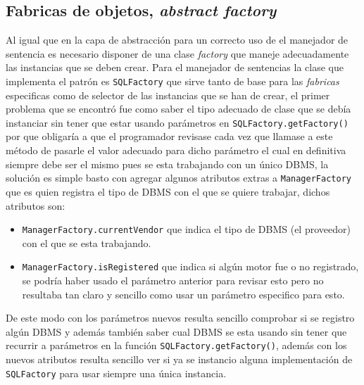 \subsection{Fabricas de objetos, \textit{abstract factory}}
%
Al igual que en la capa de abstracción para un correcto uso de el manejador de sentencia es necesario disponer de una clase \textit{factory} que maneje adecuadamente las instancias que se deben crear. Para el manejador de sentencias la clase que implementa el patrón es \verb=SQLFactory= que sirve tanto de base para las \textit{fabricas} especificas como de selector de las instancias que se han de crear, el primer problema que se encontró fue como saber el tipo adecuado de clase que se debía instanciar sin tener que estar usando parámetros en \verb=SQLFactory.getFactory()= por que obligaría a que el programador revisase cada vez que llamase a este método de pasarle el valor adecuado para dicho parámetro el cual en definitiva siempre debe ser el mismo pues se esta trabajando con un único DBMS, la solución es simple basto con agregar algunos atributos extras a \verb=ManagerFactory= que es quien registra el tipo de DBMS con el que se quiere trabajar, dichos atributos son:
%
\begin{itemize}
\item \verb=ManagerFactory.currentVendor= que indica el tipo de DBMS (el proveedor) con el que se esta trabajando.
\item \verb=ManagerFactory.isRegistered= que indica si algún motor fue o no registrado, se podría haber usado el parámetro anterior para revisar esto pero no resultaba tan claro y sencillo como usar un parámetro especifico para esto.
\end{itemize}
%
De este modo con los parámetros nuevos resulta sencillo comprobar si se registro algún DBMS y además también saber cual DBMS se esta usando sin tener que recurrir a parámetros en la función  \verb=SQLFactory.getFactory()=, además con los nuevos atributos resulta sencillo ver si ya se instancio alguna implementación de \verb=SQLFactory= para usar siempre una única instancia.

